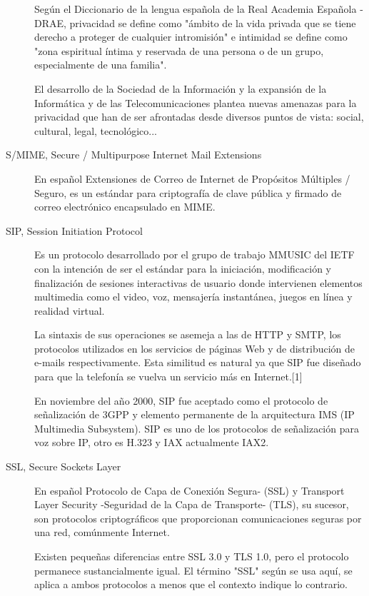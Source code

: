 \begin{description}
Según el Diccionario de la lengua española de la Real Academia Española - DRAE, privacidad se define como "ámbito de la vida privada que se tiene derecho a proteger de cualquier intromisión" e intimidad se define como "zona espiritual íntima y reservada de una persona o de un grupo, especialmente de una familia".

El desarrollo de la Sociedad de la Información y la expansión de la Informática y de las Telecomunicaciones plantea nuevas amenazas para la privacidad que han de ser afrontadas desde diversos puntos de vista: social, cultural, legal, tecnológico...

\item[S/MIME, Secure / Multipurpose Internet Mail Extensions]
En español Extensiones de Correo de Internet de Propósitos Múltiples / Seguro, es un estándar para criptografía de clave pública y firmado de correo electrónico encapsulado en MIME.

\item[SIP, Session Initiation Protocol]
Es un protocolo desarrollado por el grupo de trabajo MMUSIC del IETF con la intención de ser el estándar para la iniciación, modificación y finalización de sesiones interactivas de usuario donde intervienen elementos multimedia como el video, voz, mensajería instantánea, juegos en línea y realidad virtual.

La sintaxis de sus operaciones se asemeja a las de HTTP y SMTP, los protocolos utilizados en los servicios de páginas Web y de distribución de e-mails respectivamente. Esta similitud es natural ya que SIP fue diseñado para que la telefonía se vuelva un servicio más en Internet.[1]

En noviembre del año 2000, SIP fue aceptado como el protocolo de señalización de 3GPP y elemento permanente de la arquitectura IMS (IP Multimedia Subsystem). SIP es uno de los protocolos de señalización para voz sobre IP, otro es H.323 y IAX actualmente IAX2.

\item[SSL, Secure Sockets Layer]
En español Protocolo de Capa de Conexión Segura- (SSL) y Transport Layer Security -Seguridad de la Capa de Transporte- (TLS), su sucesor, son protocolos criptográficos que proporcionan comunicaciones seguras por una red, comúnmente Internet.

Existen pequeñas diferencias entre SSL 3.0 y TLS 1.0, pero el protocolo permanece sustancialmente igual. El término "SSL" según se usa aquí, se aplica a ambos protocolos a menos que el contexto indique lo contrario.


\end{description}
